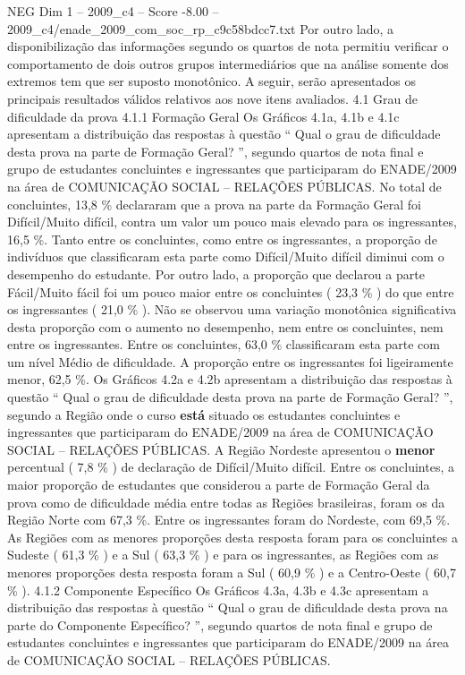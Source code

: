 \begin{textsample}{NEG Dim 1 – 2009\_c4 – Score -8.00 – 2009\_c4/enade\_2009\_com\_soc\_rp\_c9c58bdcc7.txt}
Por outro lado, a disponibilização das informações segundo os quartos de nota permitiu verificar o comportamento de dois outros grupos intermediários que na análise somente dos extremos tem que ser suposto monotônico.
A seguir, serão apresentados os principais resultados válidos relativos aos nove itens avaliados. 4.1 Grau de dificuldade da prova 4.1.1 Formação Geral Os Gráficos 4.1a, 4.1b e 4.1c apresentam a distribuição das respostas à questão “ Qual o grau de dificuldade desta prova na parte de Formação Geral? ”, segundo quartos de nota final e grupo de estudantes concluintes e ingressantes que participaram do ENADE/2009 na área de COMUNICAÇÃO SOCIAL – RELAÇÕES PÚBLICAS.
No total de concluintes, 13,8 \% declararam que a prova na parte da Formação Geral foi Difícil/Muito difícil, contra um valor um pouco mais elevado para os ingressantes, 16,5 \%.
Tanto entre os concluintes, como entre os ingressantes, a proporção de indivíduos que classificaram esta parte como Difícil/Muito difícil diminui com o desempenho do estudante.
Por outro lado, a proporção que declarou a parte Fácil/Muito fácil foi um pouco maior entre os concluintes ( 23,3 \% ) do que entre os ingressantes ( 21,0 \% ).
Não se observou uma variação monotônica significativa desta proporção com o aumento no desempenho, nem entre os concluintes, nem entre os ingressantes.
Entre os concluintes, 63,0 \% classificaram esta parte com um nível Médio de dificuldade.
A proporção entre os ingressantes foi ligeiramente menor, 62,5 \%.
Os Gráficos 4.2a e 4.2b apresentam a distribuição das respostas à questão “ Qual o grau de dificuldade desta prova na parte de Formação Geral? ”, segundo a Região onde o curso \textbf{está} situado os estudantes concluintes e ingressantes que participaram do ENADE/2009 na área de COMUNICAÇÃO SOCIAL – RELAÇÕES PÚBLICAS.
A Região Nordeste apresentou o \textbf{menor} percentual ( 7,8 \% ) de declaração de Difícil/Muito difícil.
Entre os concluintes, a maior proporção de estudantes que considerou a parte de Formação Geral da prova como de dificuldade média entre todas as Regiões brasileiras, foram os da Região Norte com 67,3 \%.
Entre os ingressantes foram do Nordeste, com 69,5 \%.
As Regiões com as menores proporções desta resposta foram para os concluintes a Sudeste ( 61,3 \% ) e a Sul ( 63,3 \% ) e para os ingressantes, as Regiões com as menores proporções desta resposta foram a Sul ( 60,9 \% ) e a Centro-Oeste ( 60,7 \% ). 4.1.2 Componente Específico Os Gráficos 4.3a, 4.3b e 4.3c apresentam a distribuição das respostas à questão “ Qual o grau de dificuldade desta prova na parte do Componente Específico? ”, segundo quartos de nota final e grupo de estudantes concluintes e ingressantes que participaram do ENADE/2009 na área de COMUNICAÇÃO SOCIAL – RELAÇÕES PÚBLICAS.

\end{textsample}
